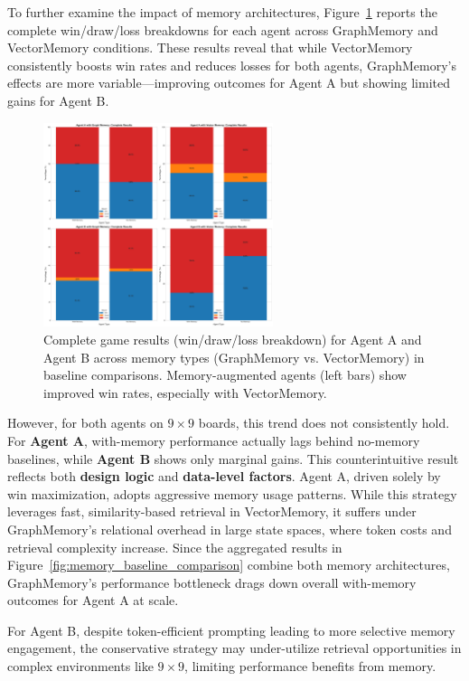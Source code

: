 \documentclass[10pt]{article}
\begin{document}
To further examine the impact of memory architectures, Figure~\ref{fig:baseline_complete_results} reports the complete win/draw/loss breakdowns for each agent across GraphMemory and VectorMemory conditions. These results reveal that while VectorMemory consistently boosts win rates and reduces losses for both agents, GraphMemory's effects are more variable—improving outcomes for Agent A but showing limited gains for Agent B.

\begin{figure}[H]
\centering
\includegraphics[width=0.6\textwidth]{figures/memory_baseline/memory_complete_results.png}
\caption{Complete game results (win/draw/loss breakdown) for Agent A and Agent B across memory types (GraphMemory vs. VectorMemory) in baseline comparisons. Memory-augmented agents (left bars) show improved win rates, especially with VectorMemory.}
\label{fig:baseline_complete_results}
\end{figure}

However, for both agents on $9\times9$ boards, this trend does not consistently hold. For \textbf{Agent A}, with-memory performance actually lags behind no-memory baselines, while \textbf{Agent B} shows only marginal gains. This counterintuitive result reflects both \textbf{design logic} and \textbf{data-level factors}. Agent A, driven solely by win maximization, adopts aggressive memory usage patterns. While this strategy leverages fast, similarity-based retrieval in VectorMemory, it suffers under GraphMemory's relational overhead in large state spaces, where token costs and retrieval complexity increase. Since the aggregated results in Figure~\ref{fig:memory_baseline_comparison} combine both memory architectures, GraphMemory's performance bottleneck drags down overall with-memory outcomes for Agent A at scale.

For Agent B, despite token-efficient prompting leading to more selective memory engagement, the conservative strategy may under-utilize retrieval opportunities in complex environments like $9\times9$, limiting performance benefits from memory.
\end{document}
